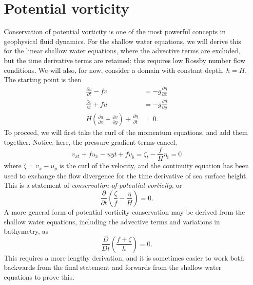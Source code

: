 \documentclass[11pt]{report}
\numberwithin{equation}{section}
\begin{document}
\section{Potential vorticity}

Conservation of potential vorticity is one of the most powerful concepts in geophysical fluid dynamics.  For the shallow water equations, we will derive this for the linear shallow water equations, where the advective terms are excluded, but the time derivative terms are retained; this requires low Rossby number flow conditions.  We will also, for now, consider a domain with constant depth, $h=H$.  The starting point is then
\begin{align}
    \frac{\partial u}{\partial t} - f v
                &= -g\frac{\partial \eta}{\partial x} \label{eq:u-shallow-linear} \\
    \frac{\partial v}{\partial t} + f u
                &= -g\frac{\partial \eta}{\partial y}  \label{eq:v-shallow-linear} \\
    H\left(\frac{\partial u}{\partial x} + \frac{\partial v}{\partial y}\right)
        + \frac{\partial \eta}{\partial t} 
                &= 0. \label{eq:cont-shallow-linear}
\end{align}
To proceed, we will first take the curl of the momentum equations, and add them together.  Notice, here, the pressure gradient terms cancel,
\begin{equation}
    v_{xt} + f u_x - u{yt} + f v_y = \zeta_t - \frac{f}{H}\eta_t = 0
\end{equation}
where $\zeta = v_x - u_y$ is the curl of the velocity, and the continuity equation has been used to exchange the flow divergence for the time derivative of sea surface height.  This is a statement of {\it conservation of potential vorticity}, or
\begin{equation}
    \frac{\partial}{\partial t}\left(\frac{\zeta}{f} - \frac{\eta}{H} \right) = 0.
    \label{eq:linear-pv-conservation}
\end{equation}
A more general form of potential vorticity conservation may be derived from the shallow water equations, including the advective terms and variations in bathymetry, as
\begin{equation}
    \frac{D}{Dt} \left( \frac{f + \zeta}{h} \right) = 0 .
    \label{eq:pv-conservation}
\end{equation}
This requires a more lengthy derivation, and it is sometimes easier to work both backwards from the final statement and forwards from the shallow water equations to prove this.  
\end{document}
